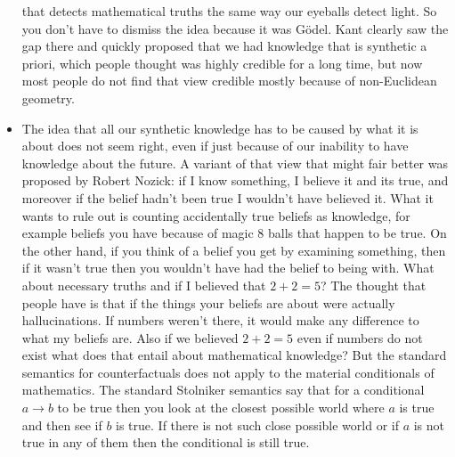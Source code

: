 \documentclass[12pt]{article}
\theoremstyle{definition}
\begin{document}
\begin{itemize}
        that detects mathematical truths the same way our eyeballs detect
        light. So you don't have to dismiss the idea because it was G\"odel.
        Kant clearly saw the gap there and quickly proposed that we had
        knowledge that is synthetic a priori, which people thought was highly
        credible for a long time, but now most people do not find that view
        credible mostly because of non-Euclidean geometry.
    \item
        The idea that all our synthetic knowledge has to be caused by what it
        is about does not seem right, even if just because of our inability to
        have knowledge about the future. A variant of that view that might fair
        better was proposed by Robert Nozick: if I know something, I believe it
        and its true, and moreover if the belief hadn't been true I wouldn't
        have believed it. What it wants to rule out is counting accidentally
        true beliefs as knowledge, for example beliefs you have because of
        magic 8 balls that happen to be true. On the other hand, if you think
        of a belief you get by examining something, then if it wasn't true then
        you wouldn't have had the belief to being with. What about necessary
        truths and if I believed that $2 + 2 = 5$? The thought that people have
        is that if the things your beliefs are about were actually
        hallucinations. If numbers weren't there, it would make any difference
        to what my beliefs are. Also if we believed $2 + 2 = 5$ even if numbers
        do not exist what does that entail about mathematical knowledge? But
        the standard semantics for counterfactuals does not apply to the
        material conditionals of mathematics. The standard Stolniker semantics
        say that for a conditional $a \rightarrow b$ to be  true then you look
        at the closest possible world where $a$ is true and then see if $b$ is
        true. If there is not such close possible world or if $a$ is not true
        in any of them then the conditional is still true.
\end{itemize}
\end{document}
